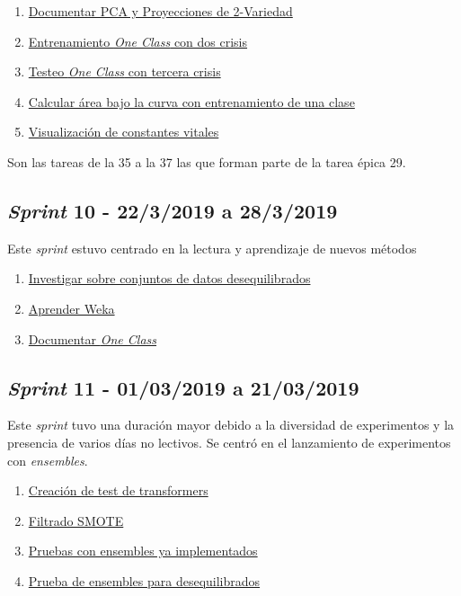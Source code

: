 \begin{enumerate}\addtocounter{enumi}{33}
	\item
	\href{https://github.com/joselucross/TFG-SmartBeds/issues/34}{Documentar PCA y Proyecciones de 2-Variedad}
	\item
	\href{https://github.com/joselucross/TFG-SmartBeds/issues/35}{Entrenamiento \textit{One Class} con dos crisis}
	\item
	\href{https://github.com/joselucross/TFG-SmartBeds/issues/36}{Testeo \textit{One Class} con tercera crisis}
	\item
	\href{https://github.com/joselucross/TFG-SmartBeds/issues/37}{Calcular área bajo la curva con entrenamiento de una clase}
	\item
	\href{https://github.com/joselucross/TFG-SmartBeds/issues/38}{Visualización de constantes vitales}
\end{enumerate}
Son las tareas de la 35 a la 37 las que forman parte de la tarea épica 29.
\subsection{\textit{Sprint} 10 - 22/3/2019 a 28/3/2019}
Este \textit{sprint} estuvo centrado en la lectura y aprendizaje de nuevos métodos

\begin{enumerate}\addtocounter{enumi}{38}
	\item
	\href{https://github.com/joselucross/TFG-SmartBeds/issues/39}{Investigar sobre conjuntos de datos desequilibrados}
	\item
	\href{https://github.com/joselucross/TFG-SmartBeds/issues/40}{Aprender Weka}
	\item
	\href{https://github.com/joselucross/TFG-SmartBeds/issues/41}{Documentar \textit{One Class}}
\end{enumerate}
\subsection{\textit{Sprint} 11 - 01/03/2019 a 21/03/2019}
Este \textit{sprint} tuvo una duración mayor debido a la diversidad de experimentos y la presencia de varios días no lectivos. Se centró en el lanzamiento de experimentos con \textit{ensembles}.
\begin{enumerate}\addtocounter{enumi}{41}
	\item
	\href{https://github.com/joselucross/TFG-SmartBeds/issues/42}{Creación de test de transformers}
	\item
	\href{https://github.com/joselucross/TFG-SmartBeds/issues/43}{Filtrado SMOTE}
	\item
	\href{https://github.com/joselucross/TFG-SmartBeds/issues/43}{Pruebas con ensembles ya implementados}
	\item
	\href{https://github.com/joselucross/TFG-SmartBeds/issues/45}{Prueba de ensembles para desequilibrados}
\end{enumerate}

